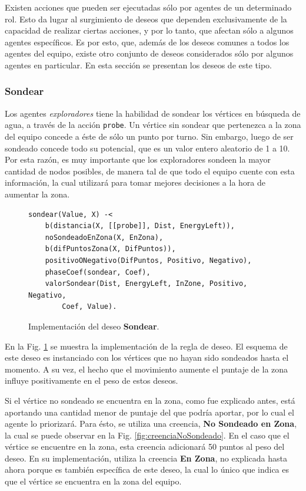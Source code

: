 \documentclass[oneside]{book}
\theoremstyle{definition}
\theoremstyle{example}
\begin{document}
Existen acciones que pueden ser ejecutadas sólo por agentes de un determinado rol. Esto da 
lugar al surgimiento de deseos que dependen exclusivamente de la capacidad de realizar 
ciertas acciones, y por lo tanto, que afectan sólo a algunos agentes específicos. Es por esto, 
que, además de los deseos comunes a todos los agentes del equipo, existe otro conjunto de 
deseos considerados sólo por algunos agentes en particular. En esta sección se presentan 
los deseos de este tipo.


\subsubsection{Sondear}

Los agentes \textit{exploradores} tiene la habilidad de sondear los vértices en 
búsqueda de agua, a través de la acción \texttt{probe}. Un vértice sin sondear 
que pertenezca a la zona del equipo concede a éste de sólo un punto por turno. 
Sin embargo, luego de ser sondeado concede todo su potencial, que es un valor 
entero aleatorio de 1 a 10. Por esta razón, es muy importante que los 
exploradores sondeen la mayor cantidad de nodos posibles, de manera tal de que 
todo el equipo cuente con esta información, la cual utilizará para tomar 
mejores decisiones a la hora de aumentar la zona.

\begin{figure}
\begin{verbatim}
sondear(Value, X) -< 
    b(distancia(X, [[probe]], Dist, EnergyLeft)),
    noSondeadoEnZona(X, EnZona),
    b(difPuntosZona(X, DifPuntos)),
    positivoONegativo(DifPuntos, Positivo, Negativo),
    phaseCoef(sondear, Coef),
    valorSondear(Dist, EnergyLeft, InZone, Positivo, Negativo, 
    	Coef, Value).
\end{verbatim}
\caption{Implementación del deseo \textbf{Sondear}.}
\label{fig:deseoSondear}
\end{figure}

En la Fig. \ref{fig:deseoSondear} se muestra la implementación de la regla de 
deseo. El esquema de este deseo es instanciado con los vértices que no hayan 
sido sondeados hasta el momento. A su vez, el hecho que el movimiento aumente
el puntaje de la zona influye positivamente en el peso de estos deseos.

Si el vértice no sondeado se encuentra en la zona, como fue explicado antes,
está aportando una cantidad menor de puntaje del que podría aportar, por lo 
cual el agente lo priorizará. Para ésto, se utiliza una creencia,
\textbf{No Sondeado en Zona}, la cual se puede observar en la Fig. 
\ref{fig:creenciaNoSondeado}. En el caso que el vértice se encuentre en la 
zona, esta creencia adicionará 50 puntos al peso del deseo. En su 
implementación, utiliza la creencia \textbf{En Zona}, no explicada hasta
ahora porque es también específica de este deseo, la cual lo único que 
indica es que el vértice se encuentra en la zona del equipo.
\end{document}
